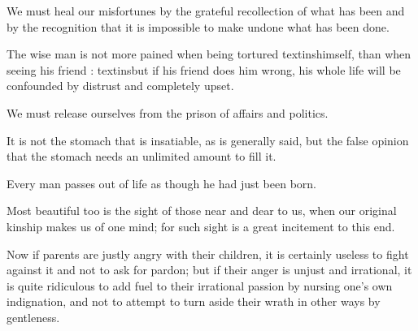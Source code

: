 \documentclass{stex}
\begin{document}
\vspace{0.5em}
\begin{sparagraph}[title=55]
  We must heal our misfortunes by the grateful recollection of what has been and by the recognition that it is impossible to make undone what has been done.
\end{sparagraph}

\vspace{0.5em}
\begin{sparagraph}[title=56--57]
  The wise man is not more pained when being tortured textins{himself, than when seeing} his friend : textins{but if his friend does him wrong}, his whole life will be confounded by distrust and completely upset.
\end{sparagraph}

\vspace{0.5em}
\begin{sparagraph}[title=58]
  We must release ourselves from the prison of affairs and politics.
\end{sparagraph}

\vspace{0.5em}
\begin{sparagraph}[title=59]
  It is not the stomach that is insatiable, as is generally said, but the false opinion that the stomach needs an unlimited amount to fill it.
\end{sparagraph}

\vspace{0.5em}
\begin{sparagraph}[title=60]
  Every man passes out of life as though he had just been born.
\end{sparagraph}

\vspace{0.5em}
\begin{sparagraph}[title=61]
  Most beautiful too is the sight of those near and dear to us, when our original kinship makes us of one mind; for such sight is a great incitement to this end.
\end{sparagraph}

\vspace{0.5em}
\begin{sparagraph}[title=62]
  Now if parents are justly angry with their children, it is certainly useless to fight against it and not to ask for pardon; but if their anger is unjust and irrational, it is quite ridiculous to add fuel to their irrational passion by nursing one’s own indignation, and not to attempt to turn aside their wrath in other ways by gentleness.
\end{sparagraph}
\end{document}
